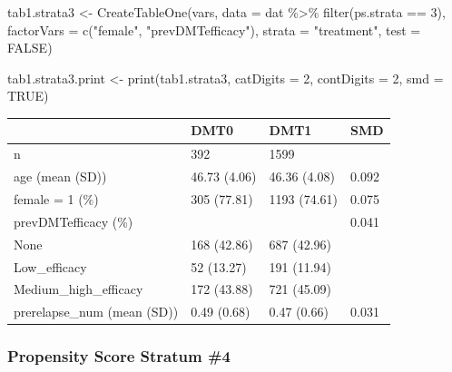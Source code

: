 \documentclass[
  letterpaper,
  DIV=11,
  numbers=noendperiod]{scrreprt}
\newenvironment{Shaded}{\begin{snugshade}}{\end{snugshade}}
\newcommand{\AttributeTok}[1]{\textcolor[rgb]{0.40,0.45,0.13}{#1}}
\newcommand{\ConstantTok}[1]{\textcolor[rgb]{0.56,0.35,0.01}{#1}}
\newcommand{\DecValTok}[1]{\textcolor[rgb]{0.68,0.00,0.00}{#1}}
\newcommand{\FunctionTok}[1]{\textcolor[rgb]{0.28,0.35,0.67}{#1}}
\newcommand{\NormalTok}[1]{\textcolor[rgb]{0.00,0.23,0.31}{#1}}
\newcommand{\OtherTok}[1]{\textcolor[rgb]{0.00,0.23,0.31}{#1}}
\newcommand{\SpecialCharTok}[1]{\textcolor[rgb]{0.37,0.37,0.37}{#1}}
\newcommand{\StringTok}[1]{\textcolor[rgb]{0.13,0.47,0.30}{#1}}
\begin{document}
\begin{Shaded}
\begin{Highlighting}[]
\NormalTok{tab1.strata3 }\OtherTok{\textless{}{-}} \FunctionTok{CreateTableOne}\NormalTok{(vars, }\AttributeTok{data =}\NormalTok{ dat }\SpecialCharTok{\%\textgreater{}\%} \FunctionTok{filter}\NormalTok{(ps.strata }\SpecialCharTok{==} \DecValTok{3}\NormalTok{), }
                               \AttributeTok{factorVars =} \FunctionTok{c}\NormalTok{(}\StringTok{"female"}\NormalTok{, }\StringTok{"prevDMTefficacy"}\NormalTok{), }
                               \AttributeTok{strata =} \StringTok{"treatment"}\NormalTok{, }\AttributeTok{test =} \ConstantTok{FALSE}\NormalTok{)}

\NormalTok{tab1.strata3.print }\OtherTok{\textless{}{-}} \FunctionTok{print}\NormalTok{(tab1.strata3, }\AttributeTok{catDigits =} \DecValTok{2}\NormalTok{, }\AttributeTok{contDigits =} \DecValTok{2}\NormalTok{, }
                            \AttributeTok{smd =} \ConstantTok{TRUE}\NormalTok{)}
\end{Highlighting}
\end{Shaded}

\begin{longtable}[]{@{}llll@{}}
\toprule\noalign{}
& DMT0 & DMT1 & SMD \\
\midrule\noalign{}
\endhead
\bottomrule\noalign{}
\endlastfoot
n & 392 & 1599 & \\
age (mean (SD)) & 46.73 (4.06) & 46.36 (4.08) & 0.092 \\
female = 1 (\%) & 305 (77.81) & 1193 (74.61) & 0.075 \\
prevDMTefficacy (\%) & & & 0.041 \\
None & 168 (42.86) & 687 (42.96) & \\
Low\_efficacy & 52 (13.27) & 191 (11.94) & \\
Medium\_high\_efficacy & 172 (43.88) & 721 (45.09) & \\
prerelapse\_num (mean (SD)) & 0.49 (0.68) & 0.47 (0.66) & 0.031 \\
\end{longtable}

\hypertarget{propensity-score-stratum-4}{%
\subsubsection{Propensity Score Stratum
\#4}\label{propensity-score-stratum-4}}
\end{document}
